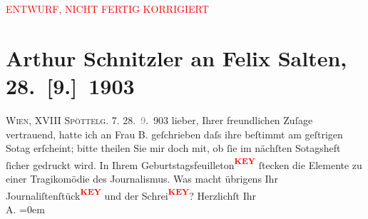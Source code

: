 
\begin{center}
            \textcolor{red}{ENTWURF, NICHT FERTIG KORRIGIERT}
                      \end{center}
            
         
         \renewcommand{\erwaehntePersonen}{Personen: Emilie Mewes-Béha, Felix Salten}
         \renewcommand{\erwaehnteOrte}{Orte: Edmund-Weiß-Gasse, Wien, XVIII., Währing}
         \renewcommand{\erwaehnteWerke}{Werke: Die Zeit, Studie}
               \section[Arthur Schnitzler an Felix Salten, 28. {[}9.{]} 1903]{ Arthur Schnitzler an Felix Salten, 28. {[}9.{]} 1903}\nopagebreak{}\rehead{ }\begin{ledgroupsized}[t]{13cm}\normalsize\beginnumbering \toendnotes[C]{\smallbreak\pagebreak[2]} 
\toendnotes[C]{\smallbreak}\pstart
           \noindent{}{\pb}\textsc{Wien, XVIII}{ }\textsc{Spöttelg. 7}. \pend
           \pstart
           \raggedleft{}28. \textcolor{gray}{9}. 903\pend
           \pstart
           lieber, Ihrer freundlichen Zuſage vertrauend, hatte ich an Frau B. geſchrieben daſs ihre \label{K_L02982-1v}\label{K_L02982-1h} beſtimmt am geſtrigen So{\geminationn}tag erſcheint; bitte theilen Sie mir doch mit, ob ſie
               im nächſten So{\geminationn}tagsheft ſicher gedruckt wird. \pend
           \pstart
           {\pb}In Ihrem Geburtstagsfeuilleton\textcolor{red}{\textsuperscript{\textbf{KEY}}} ſtecken die Elemente zu einer Tragikomödie des
               Journalismus. Was macht übrigens Ihr Journaliſtenſtück\textcolor{red}{\textsuperscript{\textbf{KEY}}} und der Schrei\textcolor{red}{\textsuperscript{\textbf{KEY}}}? \pend
           \pstart
           Herzlichſt Ihr {\\[\baselineskip]}\spacefill\mbox{A.}\pend
           \leftskip=0em{}
         
         \endnumbering{}\end{ledgroupsized}\begin{anhang}\end{anhang}\newcommand{\dateiname}{L02982}\newcommand{\titel}{Arthur Schnitzler an Felix Salten, 28. [9.] 1903}\newcommand{\editorInnen}{Martin Anton Müller und Laura Untner}
      